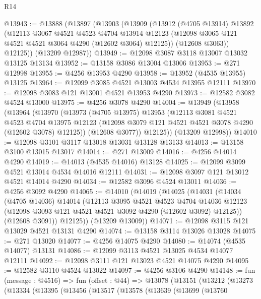 \begin{lexlean}{R14}
\begin{coremodule}
@13943 := @13888
    (@13897
      (@13903
        (@13909
          (@13912
            (@4705 @13914)
            @13892
            (@12113
              @3067
              @4521
              @4523
              @4704
              @13914
              @12123
              (@12098 @3065 @121 @4521 @4521 @3064 @4290 (@12602 @3064) @12125))
            (@12608 @3063))
          @12125))
      (@13209 @12987))
@13949 := @12098 @3087 @3118 @13007 @13032 @13125 @13134
@13952 := @13158 @3086 @13004 @13006
@13953 := @271 @12998
@13955 := @4256 @13953 @4290
@13958 := @13952 (@4535 @13955) @13125
@13964 := @12099 @3085 @4521 @13003 @4534 @13955 @12111
@13970 := @12098 @3083 @121 @13001 @4521 @13953 @4290
@13973 := @12582 @3082 @4524 @13000
@13975 := @4256 @3078 @4290
@14004 := @13949
    (@13958
      (@13964
        (@13970
          (@13973
            (@4705 @13975)
            @13953
            (@12113
              @3081
              @4521
              @4523
              @4704
              @13975
              @12123
              (@12098 @3079 @121 @4521 @4521 @3078 @4290 (@12602 @3078) @12125))
            (@12608 @3077))
          @12125))
      (@13209 @12998))
@14010 := @12098 @3101 @3117 @13018 @13031 @13128 @13133
@14013 := @13158 @3100 @13015 @13017
@14014 := @271 @13009
@14016 := @4256 @14014 @4290
@14019 := @14013 (@4535 @14016) @13128
@14025 := @12099 @3099 @4521 @13014 @4534 @14016 @12111
@14031 := @12098 @3097 @121 @13012 @4521 @14014 @4290
@14034 := @12582 @3096 @4524 @13011
@14036 := @4256 @3092 @4290
@14065 := @14010
    (@14019
      (@14025
        (@14031
          (@14034
            (@4705 @14036)
            @14014
            (@12113
              @3095
              @4521
              @4523
              @4704
              @14036
              @12123
              (@12098 @3093 @121 @4521 @4521 @3092 @4290 (@12602 @3092) @12125))
            (@12608 @3091))
          @12125))
      (@13209 @13009))
@14071 := @12098 @3115 @121 @13029 @4521 @13131 @4290
@14074 := @13158 @3114 @13026 @13028
@14075 := @271 @13020
@14077 := @4256 @14075 @4290
@14080 := @14074 (@4535 @14077) @13131
@14086 := @12099 @3113 @4521 @13025 @4534 @14077 @12111
@14092 := @12098 @3111 @121 @13023 @4521 @14075 @4290
@14095 := @12582 @3110 @4524 @13022
@14097 := @4256 @3106 @4290
@14148 := fun (message : @4516) =>
  fun (offset : @44) =>
  @13078
    (@13151
      (@13212
        (@13273
          (@13334
            (@13395
              (@13456
                (@13517
                  (@13578
                    (@13639
                      (@13699
                        (@13760

\end{coremodule}
\end{lexlean}
